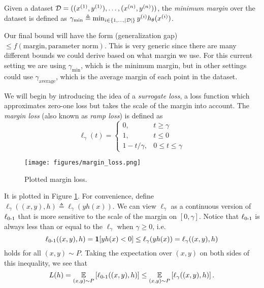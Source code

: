 \begin{definition} Given a dataset $\mathcal D = ((x^{(1)}, y^{(1)}), \dots, (x^{(n)}, y^{(n)}))$, the \textit{minimum margin} over the dataset is defined as $\gamma_{\min} \triangleq \min_{i\in\{1,\dots,|\mathcal D|\}} y^{(i)}h_\theta(x^{(i)})$.
\end{definition}

Our final bound will have the form (generalization gap) $\leq f(\text{margin},\text{parameter norm})$. This is very generic since there are many different bounds we could derive based on what margin we use. For this current setting we are using $\gamma_{\min}$, which is the minimum margin, but in other settings could use $\gamma_{\text{average}}$, which is the average margin of each point in the dataset.

We will begin by introducing the idea of a \textit{surrogate loss}, a loss function which approximates zero-one loss but takes the scale of the margin into account. The \textit{margin loss} (also known as \textit{ramp loss}) is defined as 
\begin{equation}
    \ell_\gamma(t) = \begin{cases} 
      0, & t\geq \gamma \\
      1, & t\leq 0 \\
      1-t/\gamma, & 0\leq t\leq \gamma
   \end{cases} \label{lec6:eqn:ramp_loss}
\end{equation}

\begin{figure}[ht!]
    \begin{center}
  \texttt{[image: figures/margin\_loss.png]}
  \end{center}
  \caption{Plotted margin loss.}
  \label{lec6:fig:marginloss}
\end{figure}

It is plotted in Figure \ref{lec6:fig:marginloss}. For convenience, define $\ell_\gamma((x,y), h) \triangleq \ell_\gamma(yh(x))$. We can view $\ell_\gamma$ as a continuous version of $\ell_{\textup{0-1}}$ that is more sensitive to the scale of the margin on $[0,\gamma]$. Notice that $\ell_{\textup{0-1}}$ is always less than or equal to the $\ell_\gamma$ when $\gamma\geq 0$, i.e.
\begin{equation}
    \ell_{\textup{0-1}}((x,y), h) = \mathbf{1}[yh(x) < 0]\leq \ell_\gamma(yh(x)) =\ell_\gamma ((x,y), h)
\end{equation}
holds for all $(x,y)\sim P$. Taking the expectation over $(x,y)$ on both sides of this inequality, we see that
\begin{equation}
    L(h) = \operatorname*{\mathbb{E}}_{(x,y)\sim P} \left[ \ell_{\textup{0-1}}((x,y), h) \right] \leq \operatorname*{\mathbb{E}}_{(x,y)\sim P} \left[ \ell_\gamma ((x,y), h) \right].
\end{equation}

